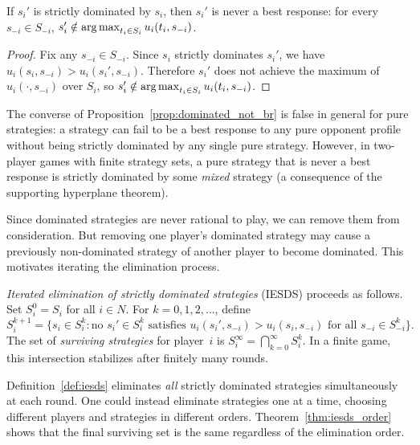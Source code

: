 \documentclass[11pt,a4paper]{article}
\begin{document}
\begin{proposition}
\label{prop:dominated_not_br}
If $s_i'$ is strictly dominated by $s_i$, then $s_i'$ is never a best
response: for every $s_{-i} \in S_{-i}$,
$s_i' \notin \operatorname{arg\,max}_{t_i \in S_i} u_i(t_i, s_{-i})$.
\end{proposition}

\begin{proof}
Fix any $s_{-i} \in S_{-i}$.  Since $s_i$ strictly dominates $s_i'$, we
have $u_i(s_i, s_{-i}) > u_i(s_i', s_{-i})$.  Therefore $s_i'$ does not
achieve the maximum of $u_i(\cdot, s_{-i})$ over $S_i$, so
$s_i' \notin \operatorname{arg\,max}_{t_i \in S_i} u_i(t_i, s_{-i})$.
\end{proof}

\begin{warning}
The converse of Proposition~\ref{prop:dominated_not_br} is false in general
for pure strategies: a strategy can fail to be a best response to any pure
opponent profile without being strictly dominated by any single pure
strategy.  However, in two-player games with finite strategy sets, a pure
strategy that is never a best response is strictly dominated by some
\emph{mixed} strategy (a consequence of the supporting hyperplane theorem).
\end{warning}

Since dominated strategies are never rational to play, we can remove them
from consideration.  But removing one player's dominated strategy may cause
a previously non-dominated strategy of another player to become dominated.
This motivates iterating the elimination process.

\begin{definition}
\label{def:iesds}
\emph{Iterated elimination of strictly dominated strategies} (IESDS)
proceeds as follows.  Set $S_i^0 = S_i$ for all $i \in N$.  For
$k = 0, 1, 2, \ldots$, define
\[
    S_i^{k+1} = \bigl\{s_i \in S_i^k :
    \text{no } s_i' \in S_i^k \text{ satisfies }
    u_i(s_i', s_{-i}) > u_i(s_i, s_{-i})
    \text{ for all } s_{-i} \in S_{-i}^k\bigr\}.
\]
The set of \emph{surviving strategies} for player~$i$ is
$S_i^\infty = \bigcap_{k=0}^\infty S_i^k$.  In a finite game, this
intersection stabilizes after finitely many rounds.
\end{definition}

\begin{remark}
\label{rem:iesds_order}
Definition~\ref{def:iesds} eliminates \emph{all} strictly dominated
strategies simultaneously at each round.  One could instead eliminate
strategies one at a time, choosing different players and strategies in
different orders.  Theorem~\ref{thm:iesds_order} shows that the final
surviving set is the same regardless of the elimination order.
\end{remark}
\end{document}
